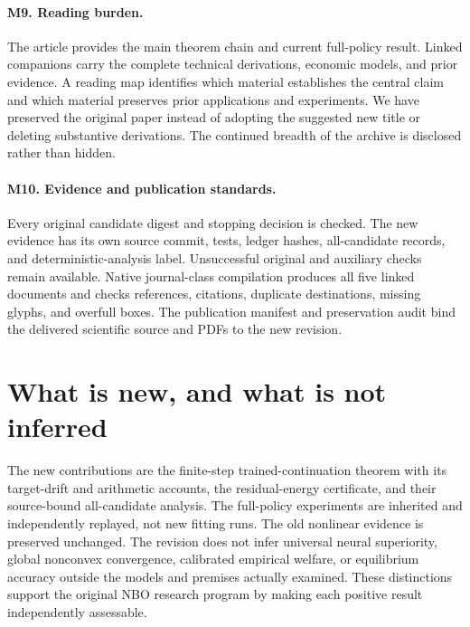 \paragraph{M9. Reading burden.}
The article provides the main theorem chain and current full-policy result.
Linked companions carry the complete technical derivations, economic models,
and prior evidence. A reading map identifies which material establishes the
central claim and which material preserves prior applications and experiments.
We have preserved the original paper instead of adopting the suggested new
title or deleting substantive derivations. The continued breadth of the
archive is disclosed rather than hidden.

\paragraph{M10. Evidence and publication standards.}
Every original candidate digest and stopping decision is checked. The new
evidence has its own source commit, tests, ledger hashes, all-candidate records,
and deterministic-analysis label. Unsuccessful original and auxiliary checks
remain available. Native journal-class compilation produces all five linked
documents and checks references, citations, duplicate destinations, missing
glyphs, and overfull boxes. The publication manifest and preservation audit
bind the delivered scientific source and PDFs to the new revision.

\section*{What is new, and what is not inferred}
The new contributions are the finite-step trained-continuation theorem with
its target-drift and arithmetic accounts, the residual-energy certificate,
and their source-bound all-candidate analysis. The full-policy experiments
are inherited and independently replayed, not new fitting runs. The old
nonlinear evidence is preserved unchanged. The revision does not infer
universal neural superiority, global nonconvex convergence, calibrated
empirical welfare, or equilibrium accuracy outside the models and premises
actually examined. These distinctions support the original NBO research
program by making each positive result independently assessable.
